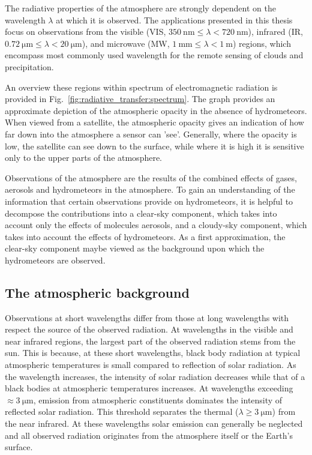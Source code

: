 The radiative properties of the atmosphere are strongly dependent on the
wavelength $\lambda$ at which it is observed. The applications presented in this
thesis focus on observations from the visible (VIS,
$\SI{350}{\nano \meter} \leq \lambda < \SI{720}{\nano \meter}$), infrared (IR,
$\SI{0.72}{\micro \meter} \leq \lambda < \SI{20}{\micro \meter}$), and microwave
(MW, $\SI{1}{\milli \meter} \leq \lambda < \SI{1}{\meter}$) regions, which
encompass most commonly used wavelength for the remote sensing of clouds and
precipitation.

An overview these regions within spectrum of electromagnetic radiation is
provided in Fig.~\ref{fig:radiative_transfer:spectrum}. The graph provides an
approximate depiction of the atmospheric opacity in the absence of hydrometeors.
When viewed from a satellite, the atmospheric opacity gives an indication of how
far down into the atmosphere a sensor can 'see'. Generally, where the opacity is
low, the satellite can see down to the surface, while where it is high it is
sensitive only to the upper parts of the atmosphere.

Observations of the atmosphere are the results of the combined effects of gases,
aerosols and hydrometeors in the atmosphere. To gain an understanding of the
information that certain observations provide on hydrometeors, it is helpful to
decompose the contributions into a clear-sky component, which takes into account
only the effects of molecules aerosols, and a cloudy-sky component, which takes
into account the effects of hydrometeors. As a first approximation, the clear-sky
component maybe viewed as the background upon which the hydrometeors are
observed.

\subsection{The atmospheric background}

Observations at short wavelengths differ from those at long wavelengths with
respect the source of the observed radiation. At wavelengths in the visible and
near infrared regions, the largest part of the observed radiation stems from the
sun. This is because, at these short wavelengths, black body radiation at
typical atmospheric temperatures is small compared to reflection of solar
radiation. As the wavelength increases, the intensity of solar radiation decreases
while that of a black bodies at atmospheric temperatures increases. At wavelengths
exceeding $\approx \SI{3}{\micro \meter}$, emission from atmospheric constituents
dominates the intensity of reflected solar radiation. This threshold separates
the thermal ($\lambda \geq \SI{3}{\micro \meter}$) from the near infrared. At
these wavelengths solar emission can generally be neglected and all observed
radiation originates from the atmosphere itself or the Earth's surface.

